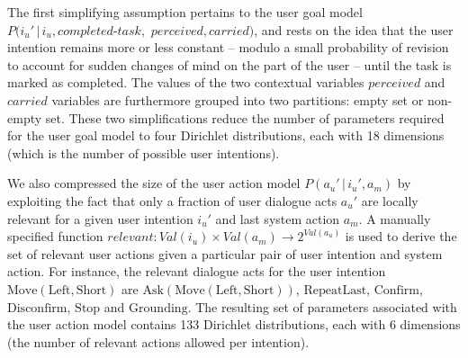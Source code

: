 The first simplifying assumption pertains to the user goal model $P(i_u' \, | \, i_u, \mathit{completed\mbox{-}task},$ $\mathit{perceived}, \mathit{carried})$, and rests on the idea that the user intention remains more or less constant -- modulo a small probability of revision to account for sudden changes of mind on the part of the user -- until the task is marked as completed. The values of the two contextual variables $\mathit{perceived}$ and $\mathit{carried}$ variables are furthermore grouped into two partitions: empty set or non-empty set. These two simplifications reduce the number of parameters required for the user goal model to four Dirichlet distributions, each with 18 dimensions (which is the number of possible user intentions). 


We also compressed the size of the user action model $P(a_u'\, | \, i_u', a_m)$ by exploiting the fact that only a fraction of user dialogue acts $a_u'$ are locally relevant for a given user intention $i_u'$ and last system action $a_m$.  A manually specified function $relevant: \mathit{Val}(i_u) \times \mathit{Val}(a_m) \rightarrow 2^{\mathit{Val}(a_u)}$ is used to derive the set of relevant user actions given a particular pair of user intention and system action. For instance, the relevant dialogue acts for the user intention $\mathrm{Move(Left,Short)}$ are $\mathrm{Ask(Move(Left,Short))}$, $\mathrm{RepeatLast}$, $\mathrm{Confirm}$, $\mathrm{Disconfirm}$, $\mathrm{Stop}$ and $\mathrm{Grounding}$. The resulting set of parameters associated with the user action model contains 133 Dirichlet distributions, each with 6 dimensions (the number of relevant actions allowed per intention). 

